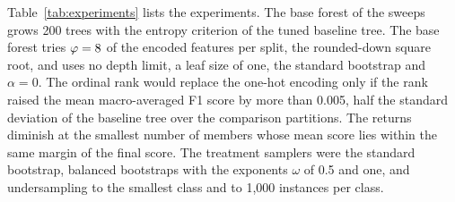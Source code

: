 \documentclass[10pt,conference]{IEEEtran}
\begin{document}
Table~\ref{tab:experiments} lists the experiments. The base forest of the sweeps grows 200 trees with the entropy criterion of the tuned baseline tree. The base forest tries $\varphi = 8$ of the \OFeatEncoded{} encoded features per split, the rounded-down square root, and uses no depth limit, a leaf size of one, the standard bootstrap and $\alpha = 0$. The ordinal rank would replace the one-hot encoding only if the rank raised the mean macro-averaged F1 score by more than 0.005, half the standard deviation of the baseline tree over the comparison partitions. The returns diminish at the smallest number of members whose mean score lies within the same margin of the final score. The treatment samplers were the standard bootstrap, balanced bootstraps with the exponents $\omega$ of 0.5 and one, and undersampling to the smallest class and to 1,000 instances per class.
\end{document}
